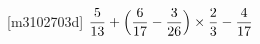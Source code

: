 [m3102703d]\quad
$\dfrac{5}{13}+\Bigl(\dfrac{6}{17}-\dfrac{3}{26}\Bigr)\times \dfrac{2}{3}-\dfrac{4}{17}$
\par
{}